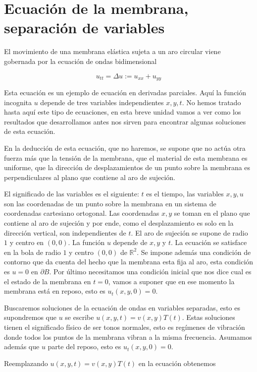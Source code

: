 \documentclass{article}
\newcounter{ejem_cont}
\renewcommand{\emph}[1]{\textcolor[rgb]{0,0,1}{#1}}
\begin{document}
\section{Ecuación de la membrana, separación de variables}

El movimiento de una membrana elástica sujeta a un aro circular viene gobernada por la ecuación de \emph{ondas bidimensional}

\[ u_{tt}=\Delta u:=u_{xx}+u_{yy}\]

Esta ecuación es un ejemplo de \emph{ecuación en derivadas parciales}. Aquí la función incognita $u$ depende de tres variables independientes $x,y,t$. No hemos tratado hasta aquí este tipo de ecuaciones, en esta breve unidad vamos a ver como los resultados que desarrollamos antes  nos sirven para encontrar algunas soluciones de esta ecuación.  

En la deducción de esta ecuación, que no haremos, se supone que no actúa otra fuerza más que la tensión de la membrana, que el material de esta membrana es uniforme, que la dirección de desplazamientos de un punto sobre la membrana es perpendiculares al plano que contiene al aro de sujeción. 

El significado de las variables es el siguiente: $t$ es el tiempo, las variables $x,y,u$ son las coordenadas de un punto sobre la membrana en un sistema de coordenadas cartesiano ortogonal. Las coordenadas $x,y$     se toman en el plano que contiene al aro de sujeción y por ende, como el desplazamiento es solo en la dirección vertical, son independientes de $t$. El aro de sujeción  se supone de radio $1$ y centro en $(0,0)$.  La función  $u$ depende de  $x,y$ y  $t$. La ecuación  se satisface en la bola de radio $1$ y centro $(0,0)$ de $\mathbb{R}^2$.  Se impone además una \emph{condición de contorno} que da cuenta del hecho que la membrana esta fija al aro, esta condición es  $u=0$ en $\partial B$. Por último necesitamos  una \emph{condición inicial} que nos dice cual es el estado de la membrana en $t=0$, vamos a suponer que en ese momento la membrana está en reposo, esto es  $u_t(x,y,0)=0$.

 Buscaremos soluciones de la ecuación de ondas en variables separadas, esto es supondremos que $u$ se escribe  $u(x,y,t)=v(x,y)T(t)$. Estas soluciones tienen el significado físico de ser \emph{tonos normales}, esto es regímenes de vibración donde todos los puntos de la membrana vibran a la misma frecuencia. Asumamos además  que $u$ parte del reposo, esto es $u_t(x,y,0)=0$. 

Reemplazando $u(x,y,t)=v(x,y)T(t)$ en la ecuación obtenemos
\end{document}
